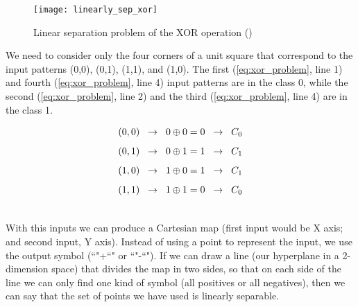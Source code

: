	\begin{figure}[!ht]
		\centering
		\texttt{[image: linearly\_sep\_xor]}
		\caption{Linear separation problem of the XOR operation (\cite{mitchell1997})}
		\label{fig:linear_sep_xor}
	\end{figure}


	We need to consider only the four corners of a unit square that correspond to the input patterns (0,0), (0,1), (1,1), and (1,0). The first (\ref{eq:xor_problem}, line 1) and fourth (\ref{eq:xor_problem}, line 4) input patterns are in the class 0, while the second (\ref{eq:xor_problem}, line 2) and the third (\ref{eq:xor_problem}, line 4) are in the class 1.

	\begin{equation}
		\label{eq:xor_problem}
	    \begin{aligned}
	        (0,0) \hspace{0.2cm} \rightarrow \hspace{0.2cm} 0 \oplus 0 = 0 \hspace{0.2cm} \rightarrow \hspace{0.2cm} C_0 \\[5pt]
	        (0,1) \hspace{0.2cm} \rightarrow \hspace{0.2cm} 0 \oplus 1 = 1 \hspace{0.2cm} \rightarrow \hspace{0.2cm} C_1 \\[5pt]
	        (1,0) \hspace{0.2cm} \rightarrow \hspace{0.2cm} 1 \oplus 0 = 1 \hspace{0.2cm} \rightarrow \hspace{0.2cm} C_1 \\[5pt]
	        (1,1) \hspace{0.2cm} \rightarrow \hspace{0.2cm} 1 \oplus 1 = 0 \hspace{0.2cm} \rightarrow \hspace{0.2cm} C_0 \\[15pt]
	    \end{aligned}
	\end{equation}

	

	With this inputs we can produce a Cartesian map (first input would be X axis; and second input, Y axis). Instead of using a point to represent the input, we use the output symbol (``"+``" or ``"-``"). If we can draw a line (our hyperplane in a 2-dimension space) that divides the map in two sides, so that on each side of the line we can only find one kind of symbol (all positives or all negatives), then we can say that the set of points we have used is linearly separable.  
	
